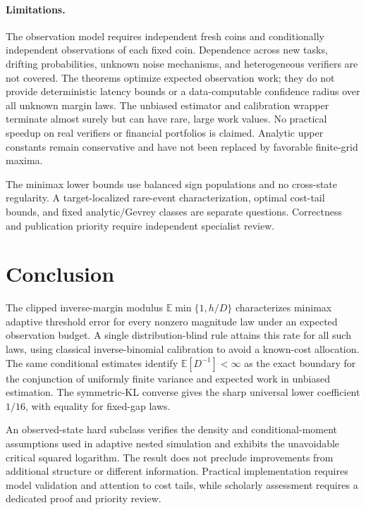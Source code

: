 \documentclass[11pt,a4paper]{article}
\theoremstyle{definition}
\newcommand{\E}{\mathbb E}
\begin{document}
\paragraph{Limitations.}
The observation model requires independent fresh coins and conditionally
independent observations of each fixed coin. Dependence across new tasks,
drifting probabilities, unknown noise mechanisms, and heterogeneous verifiers
are not covered. The theorems optimize expected observation work; they do
not provide deterministic latency bounds or a data-computable confidence
radius over all unknown margin laws. The unbiased estimator and calibration
wrapper terminate almost surely but can have rare, large work values.
No practical speedup on real verifiers or financial portfolios is claimed.
Analytic upper constants remain conservative and have not been replaced
by favorable finite-grid maxima.

The minimax lower bounds use balanced sign populations and no cross-state
regularity. A target-localized rare-event characterization, optimal cost-tail
bounds, and fixed analytic/Gevrey classes are separate questions.
Correctness and publication priority require independent specialist review.

\section{Conclusion}
The clipped inverse-margin modulus $\E\min\{1,h/D\}$ characterizes minimax
adaptive threshold error for every nonzero magnitude law under an expected
observation budget. A single distribution-blind rule attains this rate for
all such laws, using classical inverse-binomial calibration to avoid a
known-cost allocation. The same conditional estimates identify
$\E[D^{-1}]<\infty$ as the exact boundary for the conjunction of uniformly
finite variance and expected work in unbiased estimation.
The symmetric-KL converse gives the sharp universal lower coefficient
$1/16$, with equality for fixed-gap laws.

An observed-state hard subclass verifies the density and conditional-moment
assumptions used in adaptive nested simulation and exhibits the unavoidable
critical squared logarithm. The result does not preclude improvements from
additional structure or different information. Practical implementation
requires model validation and attention to cost tails, while scholarly
assessment requires a dedicated proof and priority review.
\end{document}

